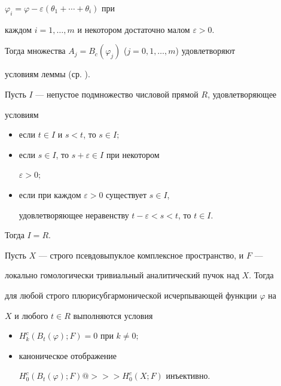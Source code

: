 $\varphi_i=\varphi-\varepsilon(\theta_1+\dotsb+\theta_i)$ при 


каждом $i=1,\dotsc,m$ и некотором достаточно малом $\varepsilon>0$. 


Тогда множества $A_j=B_c(\varphi_j)$ ($j=0,1,\dotsc,m$) удовлетворяют 


условиям леммы (ср. \cite{6}). 


 


\begin{lem} 


Пусть $I$ --- непустое подмножество числовой прямой $R$, удовлетворяющее 


условиям 


\begin{itemize} 


\item[a)] если $t\in I$ и $s<t$, то $s\in I;$ 


\item[б)] если $s\in I$, то $s+\varepsilon\in I$ при некотором 


$\varepsilon>0;$ 


\item[в)] если при каждом $\varepsilon>0$ существует $s\in I$, 


удовлетворяющее неравенству $t-\varepsilon<s<t$, то $t\in I$. 


\end{itemize} 





Тогда $I=R$.


\end{lem} 


 


\begin{thm} 


Пусть $X$ --- строго псевдовыпуклое комплексное пространство, и $F$ --- 


локально гомологически тривиальный аналитический пучок над $X$. Тогда 


для любой строго плюрисубгармонической исчерпывающей функции $\varphi$ на 


$X$ и любого $t\in R$ выполняются условия 


\begin{itemize} 


\item[a)] $H^c_k(B_t(\varphi);F)=0$ при $k\ne 0;$ 


\item[б)] каноническое отображение 


$H^c_0(B_t(\varphi);F)@>>>H^c_0(X;F)$ инъективно. 


\end{itemize} 


\end{thm} 


